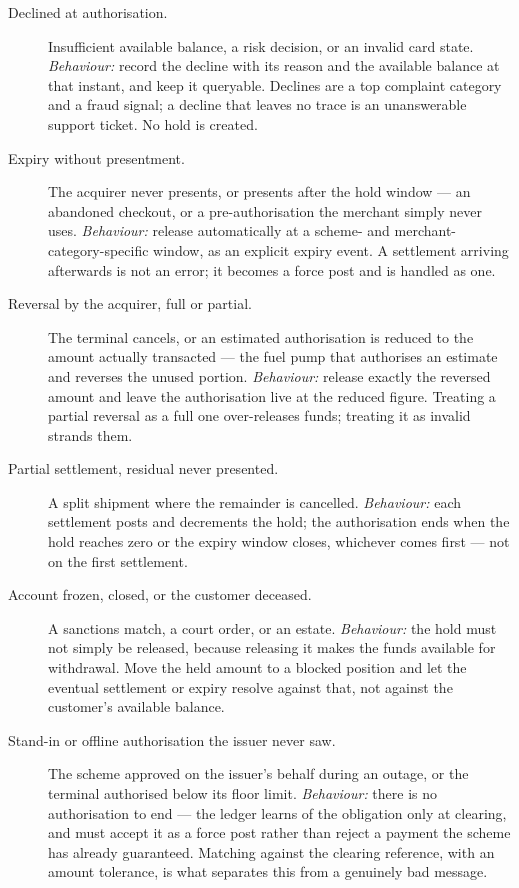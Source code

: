 \documentclass[10pt,a4paper]{article}
\begin{document}
\begin{description}
  \item[Declined at authorisation.] Insufficient available balance, a risk
        decision, or an invalid card state. \emph{Behaviour:} record the
        decline with its reason and the available balance at that instant, and
        keep it queryable. Declines are a top complaint category and a fraud
        signal; a decline that leaves no trace is an unanswerable support
        ticket. No hold is created.
  \item[Expiry without presentment.] The acquirer never presents, or presents
        after the hold window --- an abandoned checkout, or a pre-authorisation
        the merchant simply never uses. \emph{Behaviour:} release automatically
        at a scheme- and merchant-category-specific window, as an explicit
        expiry event. A settlement arriving afterwards is not an error; it
        becomes a force post and is handled as one.
  \item[Reversal by the acquirer, full or partial.] The terminal cancels, or an
        estimated authorisation is reduced to the amount actually transacted
        --- the fuel pump that authorises an estimate and reverses the unused
        portion. \emph{Behaviour:} release exactly the reversed amount and leave
        the authorisation live at the reduced figure. Treating a partial
        reversal as a full one over-releases funds; treating it as invalid
        strands them.
  \item[Partial settlement, residual never presented.] A split shipment where
        the remainder is cancelled. \emph{Behaviour:} each settlement posts and
        decrements the hold; the authorisation ends when the hold reaches zero
        or the expiry window closes, whichever comes first --- not on the first
        settlement.
  \item[Account frozen, closed, or the customer deceased.] A sanctions match, a
        court order, or an estate. \emph{Behaviour:} the hold must not simply be
        released, because releasing it makes the funds available for
        withdrawal. Move the held amount to a blocked position and let the
        eventual settlement or expiry resolve against that, not against the
        customer's available balance.
  \item[Stand-in or offline authorisation the issuer never saw.] The scheme
        approved on the issuer's behalf during an outage, or the terminal
        authorised below its floor limit. \emph{Behaviour:} there is no
        authorisation to end --- the ledger learns of the obligation only at
        clearing, and must accept it as a force post rather than reject a
        payment the scheme has already guaranteed. Matching against the
        clearing reference, with an amount tolerance, is what separates this
        from a genuinely bad message.
\end{description}
\end{document}
